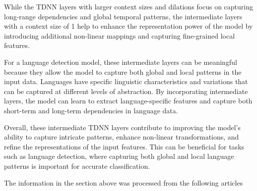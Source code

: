 \documentclass[a4paper]{article}
\begin{document}
While the TDNN layers with larger context sizes and dilations focus on capturing long-range dependencies and global temporal patterns, the intermediate layers with a context size of 1 help to enhance the representation power of the model by introducing additional non-linear mappings and capturing fine-grained local features.

For a language detection model, these intermediate layers can be meaningful because they allow the model to capture both global and local patterns in the input data. Languages have specific linguistic characteristics and variations that can be captured at different levels of abstraction. By incorporating intermediate layers, the model can learn to extract language-specific features and capture both short-term and long-term dependencies in language data.

Overall, these intermediate TDNN layers contribute to improving the model's ability to capture intricate patterns, enhance non-linear transformations, and refine the representations of the input features. This can be beneficial for tasks such as language detection, where capturing both global and local language patterns is important for accurate classification.

The information in the section above was processed from the following articles \cite{yu2020densely,peddinti2015time,garcia2016stacked}




\end{document}
